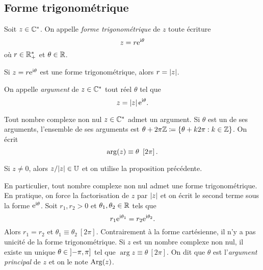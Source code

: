 \documentclass{magnolia}
\begin{document}
\subsection{Forme trigonométrique}

\begin{definition}
Soit $z\in\mathbb{C}^*$. On appelle \emph{forme trigonométrique} de $z$ toute écriture
\[z=r {\rm e}^{{\rm i}\theta}\]
où $r\in\mathbb{R}_+^*$ et $\theta\in\mathbb{R}$.
\end{definition}

\begin{remarqueUnique}
\remarque Si $z=r{\rm e}^{{\rm i}\theta}$ est une forme trigonométrique, alors $r=\left|z\right|$.
\end{remarqueUnique}

\begin{definition}[utile=-3]
On appelle \emph{argument} de $z\in\mathbb{C}^*$ tout réel
$\theta$ tel que
\[z=\left|z\right|{\rm e}^{{\rm i}\theta}.\]
\end{definition}

\begin{proposition}[utile=-3]
Tout nombre complexe non nul $z\in\mathbb{C}^*$ admet un argument. Si $\theta$ est un de ses arguments, l'ensemble de ses arguments est
$\theta+2\pi\mathbb{Z}\coloneqq\left\{\theta+k2\pi : k\in\mathbb{Z}\right\}$. On écrit
\[\arg(z)\equiv\theta\ \cro{2\pi}.\]
\end{proposition}

\begin{preuve}
Si $z\neq 0$, alors $z/|z| \in \U$ et on utilise la proposition précédente.
\end{preuve}

\begin{remarques}
\remarque En particulier, tout nombre complexe non nul admet une forme trigonométrique. En pratique, on force la factorisation de $z$ par $\left|z\right|$ et on écrit le second terme sous la forme ${\rm e}^{{\rm i}\theta}$.
\remarque Soit $r_1,r_2>0$ et $\theta_1,\theta_2\in\mathbb{R}$ tels que
  \[r_1{\rm e}^{{\rm i}\theta_1}=r_2{\rm e}^{{\rm i}\theta_2}.\]
  Alors $r_1=r_2$ et $\theta_1\equiv\theta_2\ [2\pi]$. Contrairement à la forme cartésienne, il n'y a pas unicité de la forme trigonométrique.
\remarque Si $z$ est un nombre complexe non nul, il existe un unique
  $\theta\in\left]-\pi,\pi\right]$ tel que $\arg z\equiv \theta\ [2\pi]$.
  On dit que $\theta$ est l'\emph{argument principal} de $z$ et on le note
  $\operatorname{Arg}(z)$.
\end{remarques}
\end{document}
